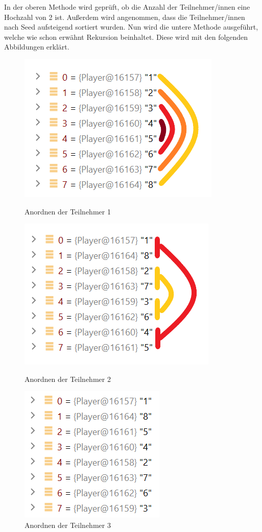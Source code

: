 In der oberen Methode wird geprüft, ob die Anzahl der Teilnehmer/innen eine Hochzahl von 2 ist.
Außerdem wird angenommen, dass die Teilnehmer/innen nach Seed aufsteigend sortiert wurden. Nun wird die untere Methode ausgeführt, 
welche wie schon erwähnt Rekursion beinhaltet. Diese wird mit den folgenden Abbildungen erklärt.

\begin{figure}[H]
    \includegraphics[scale=0.8]{pics/backend/elimination/seeding_1.png}
    \caption{Anordnen der Teilnehmer 1}
    \includegraphics[scale=0.8]{pics/backend/elimination/seeding_2.png}
    \caption{Anordnen der Teilnehmer 2}
    \includegraphics[scale=0.8]{pics/backend/elimination/seeding_3.png}
    \caption{Anordnen der Teilnehmer 3}
\end{figure}

